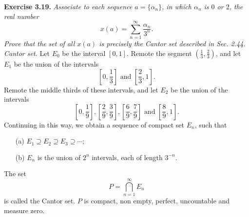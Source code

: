 \documentclass{article}
\begin{document}
\textbf{Exercise 3.19.}
\emph{Associate to each sequence $a = \{\alpha_n\}$,
in which $\alpha_n$ is $0$ or $2$, the real number
$$x(a) = \sum_{n=1}^{\infty} \frac{\alpha_n}{3^n}.$$
Prove that the set of all $x(a)$ is precisely the Cantor set described in Sec. 2.44.} \\

\emph{Cantor set.}
Let $E_0$ be the interval $[0,1]$.
Remote the segment $(\frac{1}{3},\frac{2}{3})$,
and let $E_1$ be the union of the intervals
\[
  \left[ 0,\frac{1}{3} \right] \text{ and } \left[ \frac{2}{3},1 \right].
\]
Remote the middle thirds of these intervals,
and let $E_2$ be the union of the intervals
\[
  \left[ 0,\frac{1}{9} \right],
  \left[ \frac{2}{9},\frac{3}{9} \right],
  \left[ \frac{6}{9},\frac{7}{9} \right] \text{ and }
  \left[ \frac{8}{9},1 \right].
\]
Continuing in this way, we obtain a sequence of compact set $E_n$, such that
\begin{enumerate}
\item[(a)]
$E_1 \supseteq E_2 \supseteq E_3 \supseteq \cdots$;
\item[(b)]
$E_n$ is the union of $2^n$ intervals, each of length $3^{-n}$.
\end{enumerate}
The set
\[
  P = \bigcap_{n=1}^{\infty} E_n
\]
is called the Cantor set.
$P$ is compact, non empty, perfect, uncountable and measure zero. \\
\end{document}
